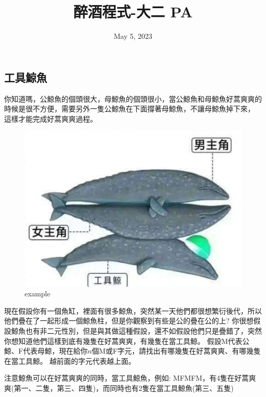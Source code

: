 \documentclass{article}
\title{醉酒程式-大二 PA}
\date{May 5, 2023}
\begin{document}
\begin{CJK*}{UTF8}{bsmi}

\maketitle

\section*{工具鯨魚}

你知道嗎，公鯨魚的個頭很大，母鯨魚的個頭很小，當公鯨魚和母鯨魚好蒿爽爽的時候是很不方便，需要另外一隻公鯨魚在下面撐著母鯨魚，不讓母鯨魚掉下來，
這樣才能完成好蒿爽爽過程。

\begin{figure}[htb]
    \vspace{-\baselineskip}  
    \begin{center}
        \includegraphics[scale=0.5]{whale-example.jpg}
      \caption{example}
      \label{fig:example}
    \end{center}
    \vspace{-\baselineskip}
\end{figure}

現在假設你有一個魚缸，裡面有很多鯨魚，突然某一天他們都很想繁衍後代，所以他們疊在了一起形成一個鯨魚柱，但是你觀察到有些是公的疊在公的上?
你很想假設鯨魚也有非二元性別，但是與其做這種假設，還不如假設他們只是疊錯了，突然你想知道他們這樣到底有幾隻在好蒿爽爽，有幾隻在當工具鯨。
假設M代表公鯨、F代表母鯨，現在給你$n$個M或F字元，請找出有哪幾隻在好蒿爽爽、有哪幾隻在當工具鯨。
越前面的字元代表越上面。

注意鯨魚可以在好蒿爽爽的同時，當工具鯨魚，例如: MFMFM，有4隻在好蒿爽爽(第一、二隻，第三、四隻)，而同時也有2隻在當工具鯨魚(第三、五隻)


\end{CJK*}
\end{document}
